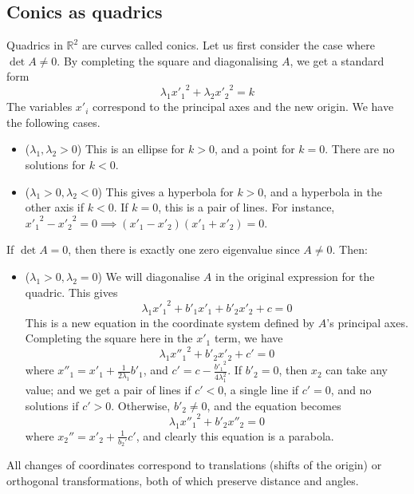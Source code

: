 \subsection{Conics as quadrics}
Quadrics in \(\mathbb R^2\) are curves called conics.
Let us first consider the case where \(\det A \neq 0\).
By completing the square and diagonalising \(A\), we get a standard form
\[
	\lambda_1 {x'_1}^2 + \lambda_2 {x'_2}^2 = k
\]
The variables \(x'_i\) correspond to the principal axes and the new origin.
We have the following cases.
\begin{itemize}
	\item (\(\lambda_1, \lambda_2 > 0\)) This is an ellipse for \(k>0\), and a point for \(k=0\).
	      There are no solutions for \(k<0\).
	\item (\(\lambda_1 > 0, \lambda_2 < 0\)) This gives a hyperbola for \(k>0\), and a hyperbola in the other axis if \(k<0\).
	      If \(k=0\), this is a pair of lines.
	      For instance, \({x'_1}^2 - {x'_2}^2 = 0 \implies (x'_1 - x'_2)(x'_1 + x'_2) = 0\).
\end{itemize}
If \(\det A = 0\), then there is exactly one zero eigenvalue since \(A \neq 0\).
Then:
\begin{itemize}
	\item (\(\lambda_1 > 0, \lambda_2 = 0\)) We will diagonalise \(A\) in the original expression for the quadric.
	      This gives
	      \[
		      \lambda_1 {x'_1}^2 + b'_1 x'_1 + b'_2 x'_2 + c = 0
	      \]
	      This is a new equation in the coordinate system defined by \(A\)'s principal axes.
	      Completing the square here in the \(x'_1\) term, we have
	      \[
		      \lambda_1 {x''_1}^2 + b'_2x'_2 + c' = 0
	      \]
	      where \(x''_1 = x'_1 + \frac{1}{2\lambda_1}b'_1\), and \(c' = c - \frac{{b'_1}^2}{4\lambda_1^2}\).
	      If \(b'_2 = 0\), then \(x_2\) can take any value; and we get a pair of lines if \(c'<0\), a single line if \(c'=0\), and no solutions if \(c'>0\).
	      Otherwise, \(b'_2 \neq 0\), and the equation becomes
	      \[
		      \lambda_1 {x''_1}^2 + b'_2x''_2 = 0
	      \]
	      where \(x_2'' = x'_2 + \frac{1}{b_2'}c'\), and clearly this equation is a parabola.
\end{itemize}
All changes of coordinates correspond to translations (shifts of the origin) or orthogonal transformations, both of which preserve distance and angles.

